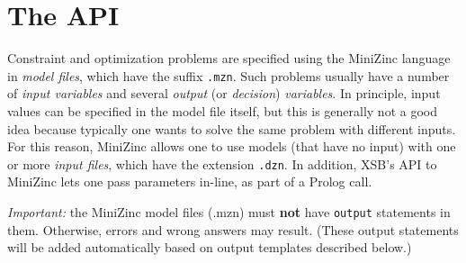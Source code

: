 \section{The API}

Constraint and optimization problems are specified using the MiniZinc
language in \emph{model files}, which have the suffix \texttt{.mzn}.
Such problems usually have a number of \emph{input variables}   and several
\emph{output} (or \emph{decision}) \emph{variables}.   
In principle, input values can be specified in the model file itself, but
this is generally not a good idea because typically one wants to solve
the same problem with different inputs.
For this reason, MiniZinc allows one to use models (that have no input)
with one or more \emph{input files}, which have the extension \texttt{.dzn}. 
In addition, XSB's API to MiniZinc lets one pass parameters in-line, as
part of a Prolog call.

\noindent
\emph{Important:} the MiniZinc model files (.mzn) must \textbf{not} have
\texttt{output} statements in them. Otherwise, errors and wrong answers
may result. (These output statements will be added automatically based on
output templates described below.)  

